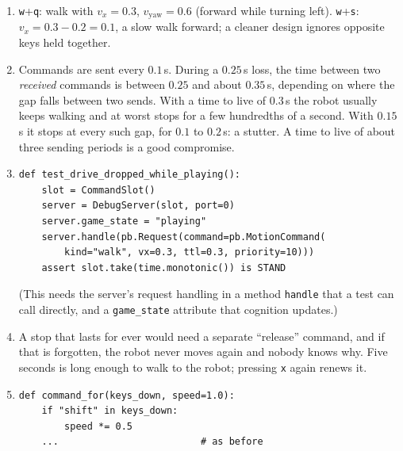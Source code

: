 \begin{enumerate}[label=\textbf{\ansnum.\arabic*}]
  \item \texttt{w}+\texttt{q}: walk with $v_x=0.3$, $v_{\text{yaw}}=0.6$ (forward while turning left). \texttt{w}+\texttt{s}: $v_x=0.3-0.2=0.1$, a slow walk forward; a cleaner design ignores opposite keys held together.
  \item Commands are sent every $0.1$\,s. During a $0.25$\,s loss, the time between two \emph{received} commands is between $0.25$ and about $0.35$\,s, depending on where the gap falls between two sends. With a time to live of $0.3$\,s the robot usually keeps walking and at worst stops for a few hundredths of a second. With $0.15$\,s it stops at every such gap, for $0.1$ to $0.2$\,s: a stutter. A time to live of about three sending periods is a good compromise.
  \item
\begin{verbatim}
def test_drive_dropped_while_playing():
    slot = CommandSlot()
    server = DebugServer(slot, port=0)
    server.game_state = "playing"
    server.handle(pb.Request(command=pb.MotionCommand(
        kind="walk", vx=0.3, ttl=0.3, priority=10)))
    assert slot.take(time.monotonic()) is STAND
\end{verbatim}
(This needs the server's request handling in a method \texttt{handle} that a test can call directly, and a \texttt{game\_state} attribute that cognition updates.)
  \item A stop that lasts for ever would need a separate ``release'' command, and if that is forgotten, the robot never moves again and nobody knows why. Five seconds is long enough to walk to the robot; pressing \texttt{x} again renews it.
  \item
\begin{verbatim}
def command_for(keys_down, speed=1.0):
    if "shift" in keys_down:
        speed *= 0.5
    ...                         # as before
\end{verbatim}
\end{enumerate}
